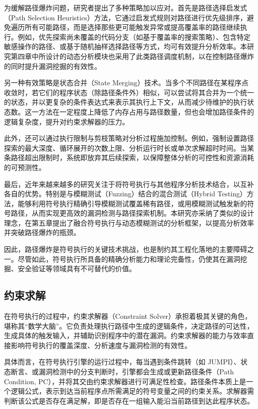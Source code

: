 \documentclass[print, master, vlined, timesmath]{DissertUESTC}
\begin{document}
为缓解路径爆炸问题，研究者提出了多种策略加以应对。首先是路径选择启发式（Path Selection Heuristics）方法\cite{}，它通过启发式规则对路径进行优先级排序，避免遍历所有可能路径，而是选择那些更可能触发异常或提高覆盖率的路径继续执行。例如，优先探索尚未覆盖的代码分支（如基于覆盖率的搜索策略\cite{}）、包含特定敏感操作的路径、或基于随机抽样选择路径等方式，均可有效提升分析效率。本研究第四章中所设计的动态分析模块也采用了此类路径调度机制，以在控制路径爆炸的同时提升漏洞挖掘的有效性。

另一种有效策略是状态合并（State Merging）技术\cite{}。当多个不同路径在某程序点收敛时，若它们的程序状态（除路径条件外）相似，可以尝试将其合并为一个统一的状态，并以更复杂的条件表达式来表示其执行上下文，从而减少待维护的执行状态数。这一方法在一定程度上降低了内存占用与路径数量，但也会增加路径条件的逻辑复杂度，提升对约束求解器的压力。

此外，还可以通过执行限制与剪枝策略对分析过程施加控制\cite{}。例如，强制设置路径探索的最大深度、循环展开的次数上限、分析运行时长或单次求解超时时间。当某条路径超出限制时，系统即放弃其后续探索，以保障整体分析的可控性和资源消耗的可预测性。

最后，近年来越来越多的研究关注于将符号执行与其他程序分析技术结合，以互补各自的优势。特别是与模糊测试（Fuzzing）结合的混合测试（Hybrid Testing）方法\cite{}，能够利用符号执行精确引导模糊测试覆盖稀有路径，或用模糊测试触发新的符号路径，从而实现更高效的漏洞检测与路径探索机制。本研究亦采纳了类似的设计理念，在第五章提出了融合符号执行与动态模糊测试的分析框架，以提高分析效率并突破路径爆炸的瓶颈。

因此，路径爆炸是符号执行的关键技术挑战，也是制约其工程化落地的主要障碍之一。尽管如此，符号执行所具备的精确分析能力和理论完备性，仍使其在漏洞挖掘、安全验证等领域具有不可替代的价值。

\subsection{约束求解}

在符号执行的过程中，约束求解器（Constraint Solver）承担着极其关键的角色，堪称其“数学大脑”\cite{}。它负责处理执行路径中生成的逻辑条件，决定路径的可达性，生成具体的触发输入，并辅助识别程序中的潜在漏洞。约束求解器的能力与效率直接影响符号执行的覆盖深度、分析速度与漏洞检测的有效性。

具体而言，在符号执行引擎的运行过程中，每当遇到条件跳转（如 JUMPI）、状态断言、或漏洞检测中的分支判断时，引擎都会生成或更新路径条件（Path Condition, PC），并将其交由约束求解器进行可满足性检查。路径条件本质上是一个逻辑公式，表示到达当前程序点所需满足的符号变量之间的约束关系。求解器需判断该公式是否存在满足解，即是否存在一组输入能沿当前路径到达此程序状态。
\end{document}
